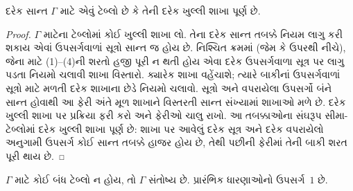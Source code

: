 \begin{prop}
  દરેક સાન્ત $\Gamma$ માટે એવું ટેબ્લો છે કે તેની દરેક
  ખુલ્લી શાખા પૂર્ણ છે.
\end{prop}

\begin{proof}
  $\Gamma$ માટેના ટેબ્લોમાં કોઈ ખુલ્લી શાખા લો. તેના
  દરેક સાન્ત તબક્કે નિયમ લાગુ કરી શકાય એવાં ઉપસર્ગવાળાં
  સૂત્રો સાન્ત જ હોય છે. નિશ્ચિત ક્રમમાં (જેમ કે ઉપરથી
  નીચે), જેના માટે (1)--(4)ની શરતો હજી પૂરી ન થતી હોય એવા
  દરેક ઉપસર્ગવાળા સૂત્ર પર લાગુ પડતા નિયમો ચલાવી
  શાખા વિસ્તારો. ક્યારેક શાખા વહેંચાશે; ત્યારે બાકીનાં
  ઉપસર્ગવાળાં સૂત્રો માટે મળતી દરેક શાખાના છેડે
  નિયમો ચલાવો. સૂત્રો અને વપરાયેલા ઉપસર્ગો બંને સાન્ત હોવાથી
  આ ફેરી અંતે મૂળ શાખાને વિસ્તરતી સાન્ત સંખ્યામાં શાખાઓ
  મળે છે. દરેક ખુલ્લી શાખા પર પ્રક્રિયા ફરી કરો અને ફેરીઓ
  ચાલુ રાખો. આ તબક્કાઓના સંઘરૂપ સીમા-ટેબ્લોમાં દરેક
  ખુલ્લી શાખા પૂર્ણ છે: શાખા પર આવેલું દરેક સૂત્ર અને દરેક
  વપરાયેલો અનુગામી ઉપસર્ગ કોઈ સાન્ત તબક્કે હાજર હોય છે,
  તેથી પછીની ફેરીમાં તેની બાકી શરત પૂરી થાય છે.
\end{proof}

\begin{thm}[પૂર્ણતા]
  $\Gamma$ માટે કોઈ બંધ ટેબ્લો ન હોય, તો $\Gamma$ સંતોષ્ય છે.
  પ્રારંભિક ધારણાઓનો ઉપસર્ગ~$1$ છે.
\end{thm}


